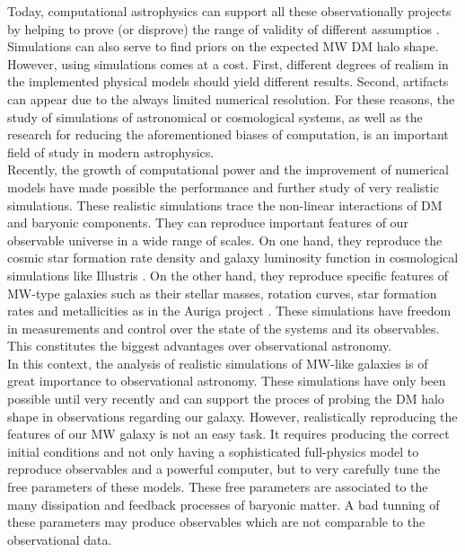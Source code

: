 \documentclass[12pt]{article}
\begin{document}
Today, computational astrophysics can support all these observationally projects by helping to prove (or disprove) the range of validity of different assumptios \cite{prove,bardeen,Vera-Ciro2011}.
Simulations can also serve to find priors on the expected MW DM halo shape.
However, using simulations comes at a cost.
First, different degrees of realism in the implemented physical models should yield different results.
Second, artifacts can appear due to the always limited numerical resolution. 
For these reasons, the study of simulations of astronomical or cosmological systems, as well as the research for reducing the aforementioned biases of computation, is an important field of study in modern astrophysics.\\

Recently, the growth of computational power and the improvement of numerical models have made possible the performance and further study of very realistic simulations.
These realistic simulations trace the non-linear interactions of DM and baryonic components. 
They can reproduce important features of our observable universe in a wide range of scales.
On one hand, they reproduce the cosmic star formation rate density and galaxy luminosity function in cosmological simulations like Illustris \cite{Illustris2}.
On the other hand, they reproduce specific features of MW-type galaxies such as their stellar masses, rotation curves, star formation rates and metallicities as in the Auriga project \cite{auriga}. 
These simulations have freedom in measurements and control over the state of the systems and its observables.
This constitutes the biggest advantages over observational astronomy.\\

In this context, the analysis of realistic simulations of MW-like galaxies is of great importance to observational astronomy. 
These simulations have only been possible until very recently \cite{aquarius} and can support the proces of probing the DM halo shape in observations regarding our galaxy.
However, realistically reproducing the features of our MW galaxy is not an easy task. 
It requires producing the correct initial conditions and not only having a sophisticated full-physics model to reproduce observables and a powerful computer, but to very carefully tune the free parameters of these models. 
These free parameters are associated to the many dissipation and feedback processes of baryonic matter.
A bad tunning of these parameters may produce observables which are not comparable to the observational data.\\
\end{document}
